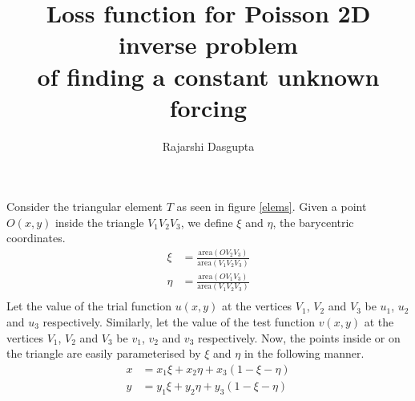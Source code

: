 \documentclass{article}
\title{
	Loss function for Poisson 2D inverse problem \\
	of finding a constant unknown forcing
	}
\author{Rajarshi Dasgupta}
\begin{document}
\maketitle


Consider the triangular element $T$
as seen in figure \ref{elems}.
Given a point $O(x,y)$ inside the triangle $V_1V_2V_3$,
we define $\xi$ and $\eta$,
the barycentric coordinates.
\begin{align*}
  \xi &= \frac{\text{area}(OV_2V_3)}{\text{area}(V_1V_2V_3)} \\
  \eta &= \frac{\text{area}(OV_1V_3)}{\text{area}(V_1V_2V_3)} \\
\end{align*}
Let the value of the trial function $u(x,y)$
at the vertices $V_1$, $V_2$ and $V_3$
be $u_1$, $u_2$ and $u_3$ respectively.
Similarly,
let the value of the test function $v(x,y)$
at the vertices $V_1$, $V_2$ and $V_3$
be $v_1$, $v_2$ and $v_3$ respectively.
Now, the points inside or on the triangle
are easily parameterised by $\xi$ and $\eta$
in the following manner.
\begin{align}
  x &= x_1 \xi + x_2 \eta + x_3 (1 - \xi - \eta) \label{x}\\
  y &= y_1 \xi + y_2 \eta + y_3 (1 - \xi - \eta) \label{y}
\end{align}
\end{document}
